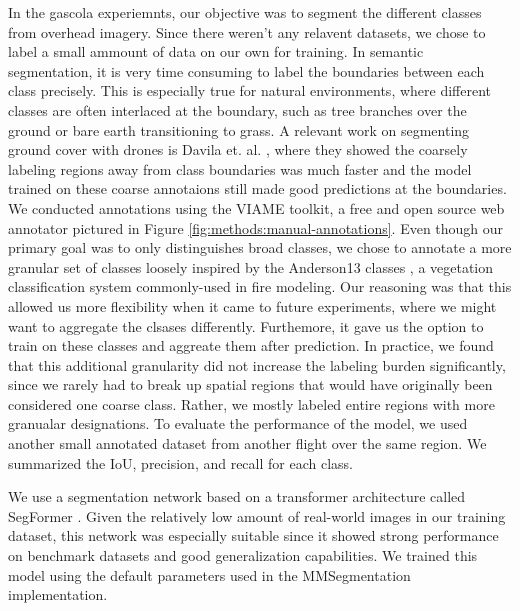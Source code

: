 In the gascola experiemnts, our objective was to segment the different classes from overhead imagery. Since there weren't any relavent datasets, we chose to label a small ammount of data on our own for training. In semantic segmentation, it is very time consuming to label the boundaries between each class precisely. This is especially true for natural environments, where different classes are often interlaced at the boundary, such as tree branches over the ground or bare earth transitioning to grass. A relevant work on segmenting ground cover with drones is Davila et. al. \cite{Davila2022ADAPT:AI}, where they showed the coarsely labeling regions away from class boundaries was much faster and the model trained on these coarse annotaions still made good predictions at the boundaries. We conducted annotations using the VIAME toolkit, a free and open source web annotator pictured in Figure \ref{fig:methods:manual-annotations}. Even though our primary goal was to only distinguishes broad classes, we chose to annotate a more granular set of classes loosely inspired by the Anderson13 classes \cite{anderson1981aids}, a vegetation classification system commonly-used in fire modeling. Our reasoning was that this allowed us more flexibility when it came to future experiments, where we might want to aggregate the clsases differently. Furthemore, it gave us the option to train on these classes and aggreate them after prediction. In practice, we found that this additional granularity did not increase the labeling burden significantly, since we rarely had to break up spatial regions that would have originally been considered one coarse class. Rather, we mostly labeled entire regions with more granualar designations. 
To evaluate the performance of the model, we used another small annotated dataset from another flight over the same region. We summarized the IoU, precision, and recall for each class.

We use a segmentation network based on a transformer architecture called SegFormer \cite{Xie2021}. Given the relatively low amount of real-world images in our training dataset, this network was especially suitable since it showed strong performance on benchmark datasets and good generalization capabilities. We trained this model using the default parameters used in the MMSegmentation \cite{mmseg2020} implementation. 

